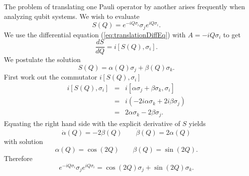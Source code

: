 The problem of translating one Pauli operator by another arises frequently when analyzing qubit systems.
We wish to evaluate \begin{equation}
S(Q) = e^{-iQ\sigma_i}\sigma_j e^{iQ\sigma_i}. \end{equation}
We use the differential equation (\ref{eq:translationDiffEq}) with $A=-iQ\sigma_i$ to get \begin{equation}
\frac{dS}{dQ} = i[S(Q),\sigma_i]. \end{equation}
We postulate the solution \begin{equation}
S(Q) = \alpha(Q)\sigma_j + \beta(Q)\sigma_k. \end{equation}
First work out the commutator $i[S(Q),\sigma_i]$ \begin{eqnarray*} 
i[S(Q),\sigma_i] &=& i[\alpha\sigma_j + \beta\sigma_k, \sigma_i] \\
&=& i \left( -2i\alpha \sigma_k + 2i\beta \sigma_j \right) \\
&=& 2\alpha \sigma_k - 2\beta \sigma_j. \end{eqnarray*}
Equating the right hand side with the explicit derivative of $S$ yields \begin{equation}
\dot{\alpha}(Q) = -2\beta(Q) \qquad \dot{\beta}(Q) = 2\alpha(Q) \nonumber \end{equation}
with solution \begin{equation}
\alpha(Q) = \cos \left( 2Q \right) \qquad \beta(Q) = \sin \left( 2Q \right). \nonumber \end{equation}
Therefore \begin{equation}
e^{-iQ\sigma_i}\sigma_j e^{iQ\sigma_i} = \cos \left( 2Q \right) \sigma_j + \sin \left( 2Q \right) \sigma_k. \end{equation}

